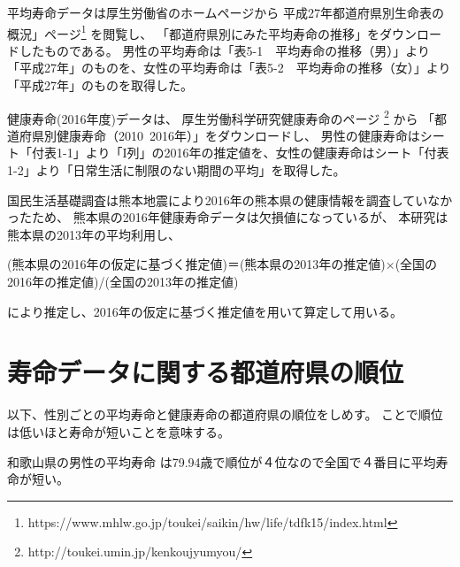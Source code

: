 平均寿命データは厚生労働省のホームページから
平成27年都道府県別生命表の概況」ページ\footnote{https://www.mhlw.go.jp/toukei/saikin/hw/life/tdfk15/index.html}
を閲覧し、
「都道府県別にみた平均寿命の推移」をダウンロードしたものである。
男性の平均寿命は「表5-1　平均寿命の推移（男）」より「平成27年」のものを、女性の平均寿命は「表5-2　平均寿命の推移（女）」より「平成27年」のものを取得した。


健康寿命(2016年度)データは、
厚生労働科学研究健康寿命のページ
\footnote{http://toukei.umin.jp/kenkoujyumyou/}
から
「都道府県別健康寿命（2010~2016年）」をダウンロードし、
男性の健康寿命はシート「付表1-1」より「I列」の2016年の推定値を、女性の健康寿命はシート「付表1-2」より「日常生活に制限のない期間の平均」を取得した。

国民生活基礎調査は熊本地震により2016年の熊本県の健康情報を調査していなかったため、
熊本県の2016年健康寿命データは欠損値になっているが、
本研究は熊本県の2013年の平均利用し、

\begin{center}
	(熊本県の2016年の仮定に基づく推定値)＝(熊本県の2013年の推定値)×(全国の2016年の推定値)/(全国の2013年の推定値)
\end{center}

により推定し、2016年の仮定に基づく推定値を用いて算定して用いる。




\newpage

\section{寿命データに関する都道府県の順位}

以下、性別ごとの平均寿命と健康寿命の都道府県の順位をしめす。
ことで順位は低いほと寿命が短いことを意味する。

和歌山県の男性の平均寿命
は79.94歳で順位が４位なので全国で４番目に平均寿命が短い。








